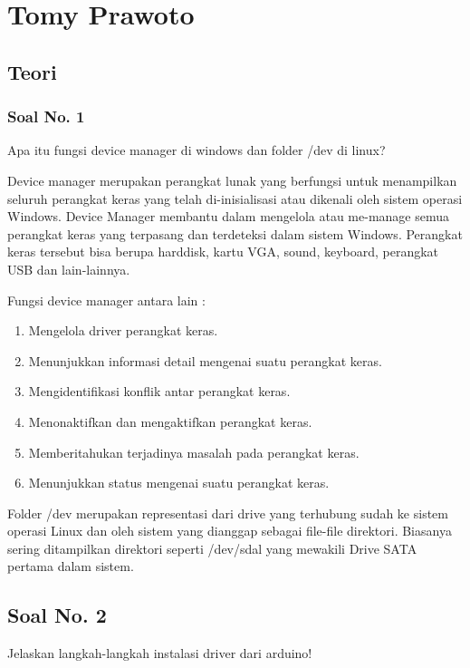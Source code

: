 
\section{Tomy Prawoto}
\subsection{Teori}
\subsubsection{Soal No. 1}
Apa itu fungsi device manager di windows dan folder /dev di linux?

Device manager merupakan perangkat lunak yang berfungsi untuk menampilkan seluruh perangkat keras yang telah di-inisialisasi atau dikenali oleh sistem operasi Windows. Device Manager membantu dalam mengelola atau me-manage semua perangkat keras yang terpasang dan terdeteksi dalam sistem Windows. Perangkat keras tersebut bisa berupa harddisk, kartu VGA, sound, keyboard, perangkat USB dan lain-lainnya.

Fungsi device manager antara lain :
\begin{enumerate}
    \item Mengelola driver perangkat keras.
	\item Menunjukkan informasi detail mengenai suatu perangkat keras.
    \item Mengidentifikasi konflik antar perangkat keras.
	\item Menonaktifkan dan mengaktifkan perangkat keras.
	\item Memberitahukan terjadinya masalah pada perangkat keras.
    \item Menunjukkan status mengenai suatu perangkat keras.
\end{enumerate}

Folder /dev merupakan representasi dari drive yang terhubung sudah ke sistem operasi Linux dan oleh sistem yang dianggap sebagai file-file direktori. Biasanya sering ditampilkan direktori seperti /dev/sdal yang mewakili Drive SATA pertama dalam sistem.

\subsection{Soal No. 2}
Jelaskan langkah-langkah instalasi driver dari arduino!

